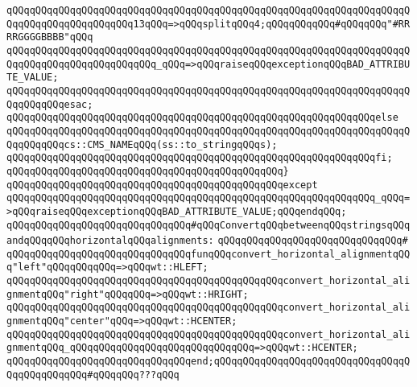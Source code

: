 \verb|qQQqqQQqqQQqqQQqqQQqqQQqqQQqqQQqqQQqqQQqqQQqqQQqqQQqqQQqqQQqqQQqqQQqqQQqqQQqqQQqqQQqqQQqqQQq13qQQq=>qQQqsplitqQQq4;qQQqqQQqqQQq#qQQqqQQq"#RRRRGGGGBBBB"qQQq|\newline
\newline
\verb|qQQqqQQqqQQqqQQqqQQqqQQqqQQqqQQqqQQqqQQqqQQqqQQqqQQqqQQqqQQqqQQqqQQqqQQqqQQqqQQqqQQqqQQqqQQqqQQq_qQQq=>qQQqraiseqQQqexceptionqQQqBAD_ATTRIBUTE_VALUE;|\newline
\verb|qQQqqQQqqQQqqQQqqQQqqQQqqQQqqQQqqQQqqQQqqQQqqQQqqQQqqQQqqQQqqQQqqQQqqQQqqQQqqQQqesac;|\newline
\verb|qQQqqQQqqQQqqQQqqQQqqQQqqQQqqQQqqQQqqQQqqQQqqQQqqQQqqQQqqQQqqQQqelse|\newline
\verb|qQQqqQQqqQQqqQQqqQQqqQQqqQQqqQQqqQQqqQQqqQQqqQQqqQQqqQQqqQQqqQQqqQQqqQQqqQQqqQQqcs::CMS_NAMEqQQq(ss::to_stringqQQqs);|\newline
\verb|qQQqqQQqqQQqqQQqqQQqqQQqqQQqqQQqqQQqqQQqqQQqqQQqqQQqqQQqqQQqqQQqfi;|\newline
\verb|qQQqqQQqqQQqqQQqqQQqqQQqqQQqqQQqqQQqqQQqqQQqqQQq}|\newline
\verb|qQQqqQQqqQQqqQQqqQQqqQQqqQQqqQQqqQQqqQQqqQQqqQQqexcept|\newline
\verb|qQQqqQQqqQQqqQQqqQQqqQQqqQQqqQQqqQQqqQQqqQQqqQQqqQQqqQQqqQQqqQQq_qQQq=>qQQqraiseqQQqexceptionqQQqBAD_ATTRIBUTE_VALUE;qQQqendqQQq;|\newline
\newline
\verb|qQQqqQQqqQQqqQQqqQQqqQQqqQQqqQQq#qQQqConvertqQQqbetweenqQQqstringsqQQqandqQQqqQQqhorizontalqQQqalignments:|\newline
\verb|qQQqqQQqqQQqqQQqqQQqqQQqqQQqqQQq#|\newline
\verb|qQQqqQQqqQQqqQQqqQQqqQQqqQQqqQQqfunqQQqconvert_horizontal_alignmentqQQq"left"qQQqqQQqqQQq=>qQQqwt::HLEFT;|\newline
\verb|qQQqqQQqqQQqqQQqqQQqqQQqqQQqqQQqqQQqqQQqqQQqqQQqconvert_horizontal_alignmentqQQq"right"qQQqqQQq=>qQQqwt::HRIGHT;|\newline
\verb|qQQqqQQqqQQqqQQqqQQqqQQqqQQqqQQqqQQqqQQqqQQqqQQqconvert_horizontal_alignmentqQQq"center"qQQq=>qQQqwt::HCENTER;|\newline
\verb|qQQqqQQqqQQqqQQqqQQqqQQqqQQqqQQqqQQqqQQqqQQqqQQqconvert_horizontal_alignmentqQQq_qQQqqQQqqQQqqQQqqQQqqQQqqQQqqQQq=>qQQqwt::HCENTER;|\newline
\verb|qQQqqQQqqQQqqQQqqQQqqQQqqQQqqQQqend;qQQqqQQqqQQqqQQqqQQqqQQqqQQqqQQqqQQqqQQqqQQqqQQq#qQQqqQQq???qQQq|\newline
\newline
